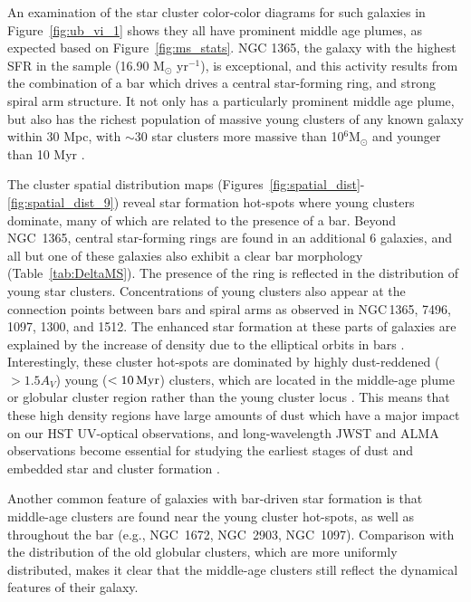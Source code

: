 \documentclass[]{aastex631}
\begin{document}
An examination of the star cluster color-color diagrams for such galaxies in Figure~\ref{fig:ub_vi_1} shows they all have prominent middle age plumes, as expected based on Figure~\ref{fig:ms_stats}. NGC 1365, the galaxy with the highest SFR in the sample (16.90 M$_{\odot}$ yr$^{-1}$), is exceptional, and this activity results from the combination of a bar which drives a central star-forming ring, and strong spiral arm structure.
It not only has a particularly prominent middle age plume, but also has the richest population of massive young clusters of any known galaxy within 30 Mpc, with $\sim$30 star clusters more massive than 10$^6$M$_{\odot}$ and younger than 10 Myr \citep{whitmore_phangs-jwst_2023}.
 
The cluster spatial distribution maps (Figures~\ref{fig:spatial_dist}-\ref{fig:spatial_dist_9}) reveal star formation hot-spots where young clusters dominate, many of which are related to the presence of a bar. Beyond NGC~1365, central star-forming rings are found in an additional 6 galaxies, and all but one of these galaxies also exhibit 
a clear bar morphology (Table~\ref{tab:DeltaMS}).  The presence of the ring is reflected in the distribution of young star clusters.
Concentrations of young clusters also appear at the connection points between bars and spiral arms as observed in NGC\,1365, 7496, 1097, 1300, and 1512. The enhanced star formation at these parts of galaxies are explained by the increase of density due to the elliptical orbits in bars \citep[e.g.][]{nguyen_luong_w43_2011,beuther_interactions_2017,tress_simulations_2020,sormani_simulations_2020,levy_morpho-kinematic_2022}. 
Interestingly, these cluster hot-spots are dominated by highly dust-reddened ($>1.5 A_V$) young ($<{\rm 10\,Myr}$) clusters, which are located in the middle-age plume or globular cluster region rather than the young cluster locus \citep{whitmore_improving_2023, thilker23sed}. This means that these high density regions have large amounts of dust which have a major impact on our HST UV-optical observations, and long-wavelength JWST and ALMA observations become essential for studying the earliest stages of dust and embedded star and cluster formation \citep[e.g.][]{johnson_physical_2015, leroy_phangs-alma_2021, emig_super_2020,rico-villas_super_2020, costa_toward_2021, levy_outflows_2021, levy_morpho-kinematic_2022, schinnerer_phangs-jwst_2023, whitmore_phangs-jwst_2023, linden_goals-jwst_2023, sun_hidden_2024}.


Another common feature of galaxies with bar-driven star formation is that middle-age clusters are found near the young cluster hot-spots, as well as throughout the bar (e.g., NGC~1672, NGC~2903, NGC~1097).  Comparison with the distribution of the old globular clusters, which are more uniformly distributed, makes it clear that the middle-age clusters still reflect the dynamical features of their galaxy.
\end{document}
